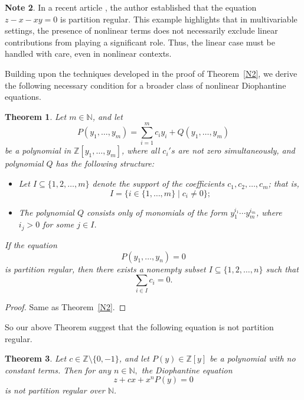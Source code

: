 \documentclass{article}
\theoremstyle{Theorem}
\newtheorem{thm}{Theorem}[section]
\theoremstyle{definition}
\newtheorem{note}[thm]{Note}
\newcommand{\N}{\mathbb{N}}
\begin{document}
\begin{note}
In a recent article \cite{G25}, the author established that the equation \( z - x - x y = 0 \) is partition regular. This example highlights that in multivariable settings, the presence of nonlinear terms does not necessarily exclude linear contributions from playing a significant role. Thus, the linear case must be handled with care, even in nonlinear contexts.

Building upon the techniques developed in the proof of Theorem~\ref{N2}, we derive the following necessary condition for a broader class of nonlinear Diophantine equations.

\begin{thm}\label{justadd}
Let \( m\in \mathbb{N} \), and let
\[
P(y_1, \ldots, y_m) = \sum_{i=1}^{m} c_{i} y_i + Q(y_1, \ldots, y_m)
\]
be a polynomial in \( \mathbb{Z}[y_1, \ldots, y_m] \), where all $c_i's$ are not zero simultaneously, and polynomial \( Q \) has the following structure:
\begin{itemize}
    \item Let \( I \subseteq \{1, 2, \ldots, m\} \) denote the support of the coefficients \( c_1, c_2, \ldots, c_m \); that is,
    \[
    I = \{ i \in \{1, \ldots, m\} \mid c_i \neq 0 \};
    \]
    
    \item The polynomial \( Q \) consists only of monomials of the form \( y_1^{i_1} \cdots y_m^{i_m} \), where \( i_j > 0 \) for some \( j \in I \).
\end{itemize}




 If the equation
\[
 P(y_1, \ldots, y_n) = 0
\]
is partition regular, then there exists a nonempty subset \( I \subseteq \{1, 2, \ldots, n\} \) such that
\[
\sum_{i \in I} c_i = 0.
\]
\end{thm}
\begin{proof}
    Same as Theorem~\ref{N2}.
\end{proof}
\end{note}


So our above Theorem suggest that the following equation is not partition regular.
\begin{thm}
Let \( c \in \mathbb{Z} \setminus \{0, -1\} \), and let \( P(y) \in \mathbb{Z}[y] \) be a polynomial with no constant terms. Then for any \(n\in \N,\) the Diophantine equation
\[
z + c x +x^n P(y) = 0
\]
is not partition regular over \( \mathbb{N} \).
\end{thm}
\end{document}
